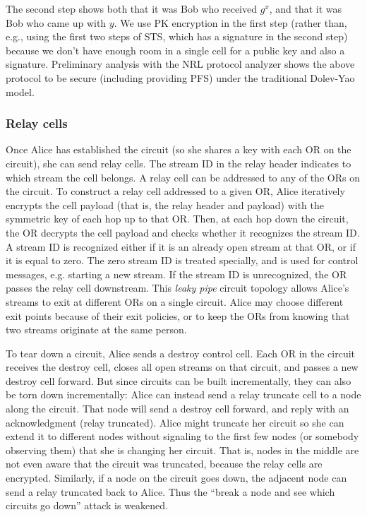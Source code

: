 \documentclass[times,10pt,twocolumn]{article}
\begin{document}
The second step shows both that it was Bob
who received $g^x$, and that it was Bob who came up with $y$. We use
PK encryption in the first step (rather than, e.g., using the first two
steps of STS, which has a signature in the second step) because we
don't have enough room in a single cell for a public key and also a
signature. Preliminary analysis with the NRL protocol analyzer \cite{meadows96}
shows the above protocol to be secure (including providing PFS) under the
traditional Dolev-Yao model.

\subsubsection{Relay cells}
Once Alice has established the circuit (so she shares a key with each
OR on the circuit), she can send relay cells.
The stream ID in the relay header indicates to which stream the cell belongs.
A relay cell can be addressed to any of the ORs on the circuit. To
construct a relay cell addressed to a given OR, Alice iteratively
encrypts the cell payload (that is, the relay header and payload)
with the symmetric key of each hop up to that OR. Then, at each hop
down the circuit, the OR decrypts the cell payload and checks whether
it recognizes the stream ID.  A stream ID is recognized either if it
is an already open stream at that OR, or if it is equal to zero. The
zero stream ID is treated specially, and is used for control messages,
e.g. starting a new stream. If the stream ID is unrecognized, the OR
passes the relay cell downstream. This \emph{leaky pipe} circuit topology
allows Alice's streams to exit at different ORs on a single circuit.  
Alice may choose different exit points because of their exit policies,
or to keep the ORs from knowing that two streams
originate at the same person.

To tear down a circuit, Alice sends a destroy control cell. Each OR
in the circuit receives the destroy cell, closes all open streams on
that circuit, and passes a new destroy cell forward. But since circuits
can be built incrementally, they can also be torn down incrementally:
Alice can instead send a relay truncate cell to a node along the circuit. That
node will send a destroy cell forward, and reply with an acknowledgment
(relay truncated). Alice might truncate her circuit so she can extend it
to different nodes without signaling to the first few nodes (or somebody
observing them) that she is changing her circuit. That is, nodes in the
middle are not even aware that the circuit was truncated, because the
relay cells are encrypted. Similarly, if a node on the circuit goes down,
the adjacent node can send a relay truncated back to Alice. Thus the
``break a node and see which circuits go down'' attack is weakened.
\end{document}
